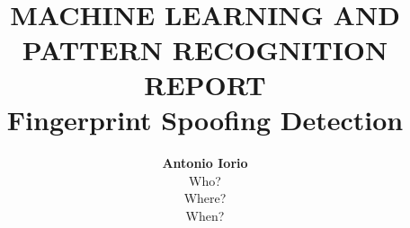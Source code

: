 \title{ \normalsize \textsc{}
\\ [2.0cm]
\HRule{1.5pt} \\
\LARGE \textbf{\uppercase{Machine Learning and Pattern Recognition Report}
\HRule{2.0pt} \\ [0.6cm] \LARGE{Fingerprint Spoofing Detection} \vspace*{10\baselineskip}}
}
\date{}
\author{\textbf{Antonio Iorio} \\
Who? \\
Where? \\
When?}

\maketitle
\newpage

\tableofcontents
\newpage